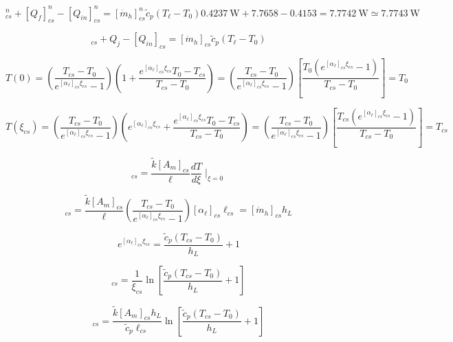 \begin{equation}%
[Q_\ell]_{cs}^{n}+[Q_f]_{cs}^{n}-[Q_{in}]_{cs}^{n}=[\dot{m}_h]_{cs}^{n}\tilde{c}_p(T_\ell-T_0)
0.4237\ \mathrm{W}+7.7658-0.4153=7.7742\ \mathrm{W} 
\simeq 7.7743\ \mathrm{W}             
\end{equation}

\begin{equation}%
[Q_\ell]_{cs}+Q_j-[Q_{in}]_{cs}=[\dot{m}_h]_{cs}\tilde{c}_p(T_\ell-T_0)
\end{equation}

\begin{equation}
T(0)=(\frac{T_{cs}-T_0}{e^{[\alpha_\ell]_{cs}\xi_{cs}}-1})(1+\frac{e^{[\alpha_\ell]_{cs}\xi_{cs}}T_0-T_{cs}}{T_{cs}-T_0}) =(\frac{T_{cs}-T_0}{e^{[\alpha_\ell]_{cs}\xi_{cs}}-1})[\frac{T_0(e^{[\alpha_\ell]_{cs}\xi_{cs}}-1)}{T_{cs}-T_0}]=T_0
\end{equation}

\begin{equation}
T(\xi_{cs})=(\frac{T_{cs}-T_0}{e^{[\alpha_\ell]_{cs}\xi_{cs}}-1})(e^{[\alpha_\ell]_{cs}\xi_{cs}}+\frac{e^{[\alpha_\ell]_{cs}\xi_{cs}}T_0-T_{cs}}{T_{cs}-T_0}) =(\frac{T_{cs}-T_0}{e^{[\alpha_\ell]_{cs}\xi_{cs}}-1})[\frac{T_{cs}(e^{[\alpha_\ell]_{cs}\xi_{cs}}-1)}{T_{cs}-T_0}]=T_{cs}
\end{equation}

\begin{equation}
[Q_{in}]_{cs}=\frac{\tilde{k}[A_m]_{cs}}{\ell}\frac{dT}{d\xi}\mid_{\xi=0}
\end{equation}

\begin{equation}
[Q_{in}]_{cs}=\frac{\tilde{k}[A_m]_{cs}}{\ell}(\frac{T_{cs}-T_0}{e^{[\alpha_\ell]_{cs}\xi_{cs}}-1})[\alpha_\ell]_{cs}\ell_{cs}=[\dot{m}_h]_{cs}h_L
\end{equation}

\begin{equation}%
e^{[\alpha_\ell]_{cs}\xi_{cs}}=\frac{\tilde{c}_p(T_{cs}-T_0)}{h_L}+1
\end{equation}

\begin{equation}%
[\alpha_\ell]_{cs}=\frac{1}{\xi_{cs}}\ln[\frac{\tilde{c}_p(T_{cs}-T_0)}{h_L}+1]
\end{equation}

\begin{equation}%
[Q_{in}]_{cs}=\frac{\tilde{k}[A_m]_{cs}h_L}{\tilde{c}_p\ell_{cs}}\ln[\frac{\tilde{c}_p(T_{cs}-T_0)}{h_L}+1]
\end{equation}

